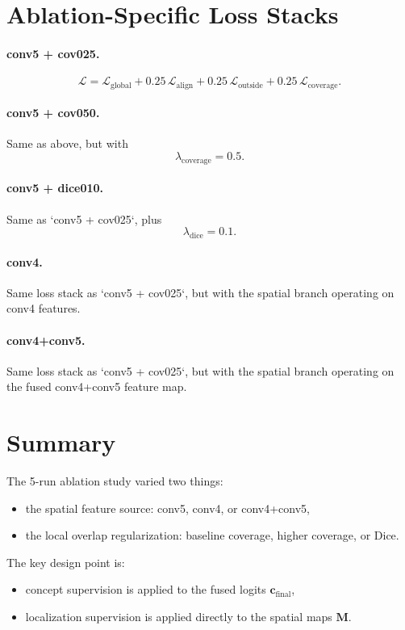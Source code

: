 \documentclass[11pt]{article}
\begin{document}
\section{Ablation-Specific Loss Stacks}
\paragraph{conv5 + cov025.}
\[
\mathcal{L}
=
\mathcal{L}_{\mathrm{global}}
+
0.25\,\mathcal{L}_{\mathrm{align}}
+
0.25\,\mathcal{L}_{\mathrm{outside}}
+
0.25\,\mathcal{L}_{\mathrm{coverage}}.
\]

\paragraph{conv5 + cov050.}
Same as above, but with
\[
\lambda_{\mathrm{coverage}} = 0.5.
\]

\paragraph{conv5 + dice010.}
Same as `conv5 + cov025`, plus
\[
\lambda_{\mathrm{dice}} = 0.1.
\]

\paragraph{conv4.}
Same loss stack as `conv5 + cov025`, but with the spatial branch operating on
conv4 features.

\paragraph{conv4+conv5.}
Same loss stack as `conv5 + cov025`, but with the spatial branch operating on
the fused conv4+conv5 feature map.

\section{Summary}
The 5-run ablation study varied two things:
\begin{itemize}
    \item the spatial feature source: conv5, conv4, or conv4+conv5,
    \item the local overlap regularization: baseline coverage, higher coverage, or Dice.
\end{itemize}

The key design point is:
\begin{itemize}
    \item concept supervision is applied to the fused logits $\mathbf{c}_{\mathrm{final}}$,
    \item localization supervision is applied directly to the spatial maps $\mathbf{M}$.
\end{itemize}
\end{document}
